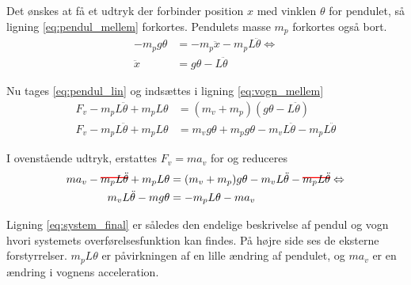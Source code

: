 Det ønskes at få et udtryk der forbinder position $x$ med vinklen $\theta$ for pendulet, så ligning \ref{eq:pendul_mellem} forkortes. Pendulets masse $m_p$ forkortes også bort. 
\begin{align}
-m_pg\theta &= -m_p\ddot{x}-m_p L \ddot{\theta} \Leftrightarrow\\
\ddot{x} &= g \theta -L \ddot{\theta} \label{eq:pendul_lin}
\end{align}

Nu tages \ref{eq:pendul_lin} og indsættes i ligning \ref{eq:vogn_mellem}
\begin{align}
F_v - m_p L\ddot{\theta} + m_p L\theta &= (m_v + m_p)(g \theta -L \ddot{\theta})  \\
F_v  - m_p L\ddot{\theta} + m_p L\theta &= m_v g \theta +  m_p g \theta - m_v L \ddot{\theta} - m_p L \ddot{\theta}
\end{align}

I ovenstående udtryk, erstattes $F_v = ma_v$ for og reduceres
\begin{align}
m a_v - \hcancel[red]{ m_p L\ddot{\theta}} + m_p L\theta &= (m_v + m_p) g \theta - m_v L \ddot{\theta} - \hcancel[red]{ m_p L\ddot{\theta}} \Leftrightarrow \\
m_v L \ddot{\theta} - m g \theta &= - m_p L\theta -m a_v \label{eq:system_final}
\end{align} 

Ligning \ref{eq:system_final} er således den endelige beskrivelse af pendul og vogn hvori systemets overførelsesfunktion kan findes.
På højre side ses de eksterne forstyrrelser. 
$m_pL\theta $ er påvirkningen af en lille ændring af pendulet, og $m a_v$ er en ændring i vognens acceleration.